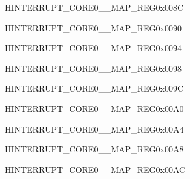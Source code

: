 \begin{register}{H}{INTERRUPT\_CORE0\_\_MAP\_REG}{0x008C}\label{regdesc:INTERRUPTCORE0LEDCINTMAPREG}
\end{register}
\vspace{-3em}

\begin{register}{H}{INTERRUPT\_CORE0\_\_MAP\_REG}{0x0090}\label{regdesc:INTERRUPTCORE0EFUSEINTMAPREG}
\end{register}
\vspace{-3em}

\begin{register}{H}{INTERRUPT\_CORE0\_\_MAP\_REG}{0x0094}\label{regdesc:INTERRUPTCORE0TWAIINTMAPREG}
\end{register}
\vspace{-3em}

\begin{register}{H}{INTERRUPT\_CORE0\_\_MAP\_REG}{0x0098}\label{regdesc:INTERRUPTCORE0USBINTRMAPREG}
\end{register}
\vspace{-3em}

\begin{register}{H}{INTERRUPT\_CORE0\_\_MAP\_REG}{0x009C}\label{regdesc:INTERRUPTCORE0RTCCOREINTRMAPREG}
\end{register}
\vspace{-3em}

\begin{register}{H}{INTERRUPT\_CORE0\_\_MAP\_REG}{0x00A0}\label{regdesc:INTERRUPTCORE0RMTINTRMAPREG}
\end{register}
\vspace{-3em}

\begin{register}{H}{INTERRUPT\_CORE0\_\_MAP\_REG}{0x00A4}\label{regdesc:INTERRUPTCORE0PCNTINTRMAPREG}
\end{register}
\vspace{-3em}

\begin{register}{H}{INTERRUPT\_CORE0\_\_MAP\_REG}{0x00A8}\label{regdesc:INTERRUPTCORE0I2CEXT0INTRMAPREG}
\end{register}
\vspace{-3em}

\begin{register}{H}{INTERRUPT\_CORE0\_\_MAP\_REG}{0x00AC}\label{regdesc:INTERRUPTCORE0I2CEXT1INTRMAPREG}
\end{register}
\vspace{-3em}


